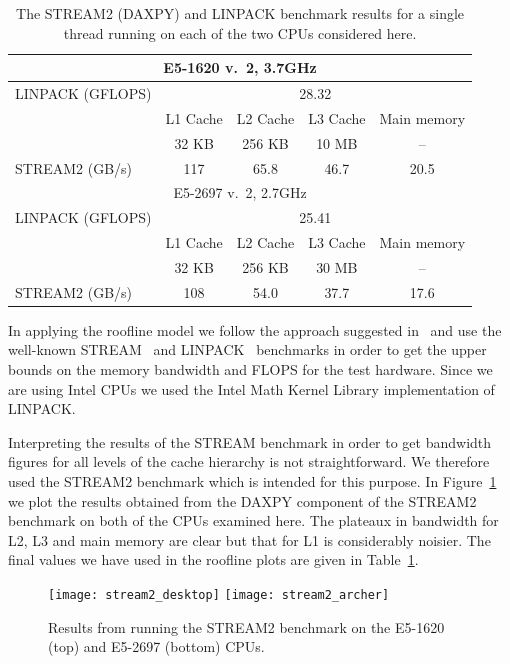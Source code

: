 \documentclass[12pt]{article}
\begin{document}
\begin{table}
\begin{tabular}{|l|c|c|c|c|}
\hline
  \multicolumn{5}{|c|}{E5-1620 v.~2, 3.7GHz} \\
  \hline
LINPACK (GFLOPS) & \multicolumn{4}{c|}{28.32} \\
\hline
 &  L1 Cache & L2 Cache & L3 Cache & Main memory \\
 &   32 KB   & 256 KB   & 10 MB    &  --         \\
\hline
STREAM2 (GB/s)   &  117  &  65.8  & 46.7 &  20.5 \\
  \hline
\multicolumn{5}{|c|}{E5-2697 v.~2, 2.7GHz}  \\
\hline
LINPACK (GFLOPS) & \multicolumn{4}{c|}{25.41} \\
\hline
 & L1 Cache & L2 Cache & L3 Cache & Main memory \\
 &   32 KB  & 256 KB   & 30 MB    &  --         \\
\hline
STREAM2 (GB/s) & 108 & 54.0 & 37.7  &  17.6 \\
\hline
\end{tabular}
\caption{The STREAM2 (DAXPY) and LINPACK benchmark results for a
  single thread running on each of the two CPUs considered here.}
\label{TAB_stream_linpack}
\end{table}

In applying the roofline model we follow the approach suggested
in~\cite{para_pearls} and use the well-known STREAM~\cite{stream} and
LINPACK~\cite{linpack} benchmarks in order to get the upper bounds on
the memory bandwidth and FLOPS for the test hardware. Since we are
using Intel CPUs we used the Intel Math Kernel Library implementation
of LINPACK.

Interpreting the results of the STREAM benchmark in order to get
bandwidth figures for all levels of the cache hierarchy is not
straightforward. We therefore used the STREAM2 benchmark which is
intended for this purpose. In Figure~\ref{FIG_stream2} we plot the
results obtained from the DAXPY component of the STREAM2 benchmark on
both of the CPUs examined here. The plateaux in bandwidth for L2, L3
and main memory are clear but that for L1 is considerably noisier. The
final values we have used in the roofline plots are given in
Table~\ref{TAB_stream_linpack}.

\begin{figure}
\texttt{[image: stream2\_desktop]}
\texttt{[image: stream2\_archer]}
\caption{Results from running the STREAM2 benchmark on the E5-1620
  (top) and E5-2697 (bottom) CPUs.}
\label{FIG_stream2}
\end{figure}
\end{document}
